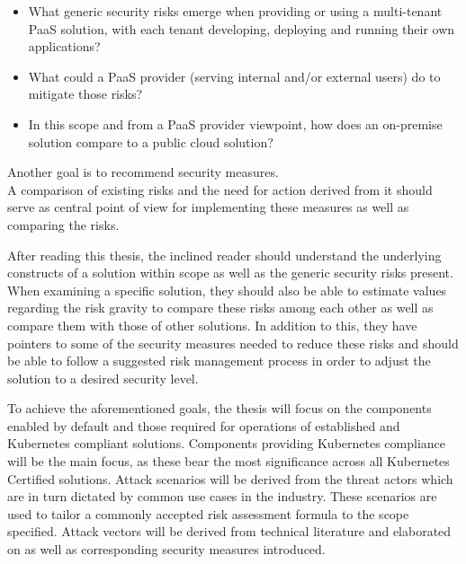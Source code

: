 \begin{itemize}

\item What generic security risks emerge when providing or using a multi-tenant PaaS solution,
with each tenant developing, deploying and running their own applications? 

\item What could a PaaS provider (serving internal and/or external users) do to mitigate those risks? 

\item  In this scope and from a PaaS provider viewpoint, how does an on-premise solution compare
to a public cloud solution? 

\end{itemize}

Another goal is to recommend security measures. \\
A comparison of existing risks and the need for action derived from it should serve as central point of view for implementing these measures as well as comparing the risks. 


After reading this thesis, the inclined reader should understand the underlying constructs of a solution within scope as well as the generic security risks present. When examining a specific solution, they should also be able to estimate values regarding the risk gravity to compare these risks among each other as well as compare them with those of other solutions. In addition to this, they have pointers to some of the security measures needed to reduce these risks and should be able to follow a suggested risk management process in order to adjust the solution to a desired security level.


To achieve the aforementioned goals, the thesis will focus on the components enabled by default and those required for operations of established and Kubernetes compliant solutions.
Components providing Kubernetes compliance will be the main focus, as these bear the most significance across all Kubernetes Certified solutions. 
Attack scenarios will be derived from the threat actors which are in turn dictated by common use cases in the industry.
These scenarios are used to tailor a commonly accepted risk assessment formula to the scope specified.
Attack vectors will be derived from technical literature and elaborated on as well as corresponding security measures introduced.


